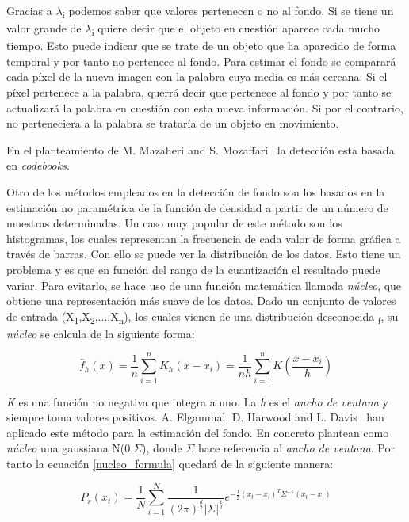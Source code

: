 Gracias a $\lambda$\textsubscript{i} podemos saber que valores pertenecen o no al fondo. Si se tiene un valor grande de $\lambda$\textsubscript{i} quiere decir que el objeto en cuestión aparece cada mucho tiempo. Esto puede indicar que se trate de un objeto que ha aparecido de forma temporal y por tanto no pertenece al fondo. Para estimar el fondo se comparará cada píxel de la nueva imagen con la palabra cuya media es más cercana. Si el píxel pertenece a la palabra, querrá decir que pertenece al fondo y por tanto se actualizará la palabra en cuestión con esta nueva información. Si por el contrario, no perteneciera a la palabra se trataría de un objeto en movimiento.

En el planteamiento de M. Mazaheri and S. Mozaffari~\cite{real_time_adaptative_background} la detección esta basada en \textit{codebooks}.

Otro de los métodos empleados en la detección de fondo son los basados en la estimación no paramétrica de la función de densidad a partir de un número de muestras determinadas. Un caso muy popular de este método son los histogramas, los cuales representan la frecuencia de cada valor de forma gráfica a través de barras. Con ello se puede ver la distribución de los datos. Esto tiene un problema y es que en función del rango de la cuantización el resultado puede variar. Para evitarlo, se hace uso de una función matemática llamada \textit{núcleo}, que obtiene una representación más suave de los datos. Dado un conjunto de valores de entrada (X\textsubscript{1},X\textsubscript{2},...,X\textsubscript{n}), los cuales vienen de una distribución desconocida \textsubscript{f}, su \textit{núcleo} se calcula de la siguiente forma:

\begin{equation}\label{nucleo_formula}
\widehat{f}_{h}(x) = \frac{1}{n}\sum_{i=1}^{n}K_{h}(x - x_{i}) = \frac{1}{nh}\sum_{i=1}^{n}K(\frac{x - x_{i}}{h})
\end{equation}

\textit{K} es una función no negativa que integra a uno. La \textit{h} es el \textit{ancho de ventana} y siempre toma valores positivos. 
A. Elgammal, D. Harwood and L. Davis~\cite{non_parametric_model} han aplicado este método para la estimación del fondo. En concreto plantean como \textit{núcleo} una gaussiana N(0,$\Sigma$), donde $\Sigma$ hace referencia al \textit{ancho de ventana}. Por tanto la ecuación \ref{nucleo_formula} quedará de la siguiente manera:

\begin{equation}\label{nucleo_formula_new}
{P}_{r}(x_{t}) = \frac{1}{N}\sum_{i=1}^{N}\frac{1}{(2\pi)^\frac{d}{2}|\Sigma|^\frac{1}{2}} e^{-\frac{1}{2}(x_{t}-x_{i})^{T}\Sigma^{-1}(x_{t}-x_{i})}
\end{equation}

